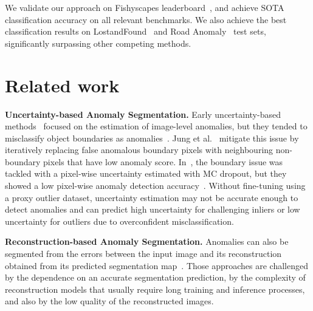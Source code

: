 \documentclass[runningheads]{llncs}
\begin{document}
We validate our approach on Fishyscapes leaderboard~\cite{blum2019fishyscapes}, and achieve SOTA classification accuracy on all relevant benchmarks. We also achieve the best classification results on LostandFound~\cite{pinggera2016lost} and Road Anomaly~\cite{lis2019detecting} test sets, significantly surpassing other competing methods. 










\section{Related work}
\label{sec:related}
\noindent\textbf{Uncertainty-based Anomaly Segmentation.}
Early uncertainty-based methods~\cite{lee2017training,liang2017enhancing,hendrycks2016baseline,tian2021weakly} focused on the estimation of image-level anomalies, but 
they tended to misclassify object boundaries as anomalies~\cite{jung2021standardized}. 
Jung et al.~\cite{jung2021standardized} mitigate this issue by iteratively replacing false anomalous boundary pixels with neighbouring non-boundary pixels that have low anomaly score. 
In~\cite{kendall2017uncertainties,lakshminarayanan2016simple,mukhoti2018evaluating}, the boundary issue was tackled with a pixel-wise uncertainty estimated with MC dropout, but they showed a low pixel-wise anomaly detection accuracy~\cite{lis2019detecting}. Without fine-tuning using a proxy outlier dataset, uncertainty estimation may not be accurate enough to detect anomalies and can predict high uncertainty for challenging inliers or low uncertainty for outliers due to overconfident misclassification. 

\noindent\textbf{Reconstruction-based Anomaly Segmentation.}
Anomalies can also be segmented from the errors between the input image and its reconstruction obtained from its predicted segmentation map~\cite{baur2018deep,creusot2015real,chen2021deep,haldimann2019not,lis2019detecting,xia2020synthesize,di2021pixel,vojir2021road,liu2020photoshopping,tian2021constrained}. 
Those approaches are challenged by the dependence on an accurate segmentation prediction, by the complexity of reconstruction models 
that usually require long training and inference processes, and also by the low quality of the reconstructed images.
\end{document}
